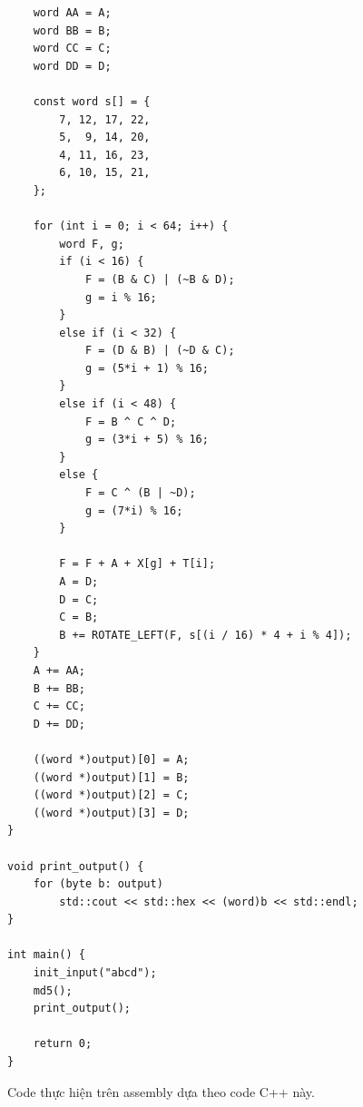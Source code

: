 \documentclass[../report.tex]{subfiles}
\begin{document}
\begin{lstlisting}
    word AA = A;
    word BB = B;
    word CC = C;
    word DD = D;

    const word s[] = {
        7, 12, 17, 22, 
        5,  9, 14, 20,
        4, 11, 16, 23,
        6, 10, 15, 21,
    };

    for (int i = 0; i < 64; i++) {
        word F, g;
        if (i < 16) {
            F = (B & C) | (~B & D);
            g = i % 16;
        }
        else if (i < 32) {
            F = (D & B) | (~D & C);
            g = (5*i + 1) % 16;
        }
        else if (i < 48) {
            F = B ^ C ^ D;
            g = (3*i + 5) % 16;
        }
        else {
            F = C ^ (B | ~D);
            g = (7*i) % 16;
        }
        
        F = F + A + X[g] + T[i]; 
        A = D;
        D = C;
        C = B;
        B += ROTATE_LEFT(F, s[(i / 16) * 4 + i % 4]);
    }
    A += AA;
    B += BB;
    C += CC;
    D += DD;

    ((word *)output)[0] = A;
    ((word *)output)[1] = B;
    ((word *)output)[2] = C;
    ((word *)output)[3] = D;
}

void print_output() {
    for (byte b: output)
        std::cout << std::hex << (word)b << std::endl;
}

int main() {
    init_input("abcd");
    md5();
    print_output();

    return 0;
}
\end{lstlisting}

\noindent Code thực hiện trên assembly dựa theo code C++ này. 
\end{document}

